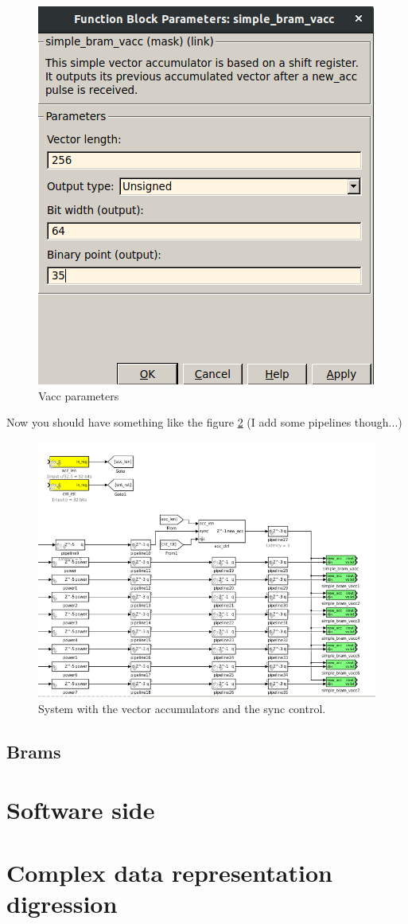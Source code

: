 \begin{figure}
    \centering
    \includegraphics[scale=0.4]{images/vacc_params.png}
    \caption{Vacc parameters}
    \label{fig:vacc_parameters}
\end{figure}


Now you should have something like the figure \ref{fig:vacc_diag} (I add some pipelines though...)

\begin{figure}
    \centering
    \includegraphics[scale=0.4]{images/vacc.png}
    \caption{System with the vector accumulators and the sync control.}
    \label{fig:vacc_diag}
\end{figure}


\subsection{Brams}


\section{Software side}



\section{Complex data representation digression}
\label{sec:complex}
